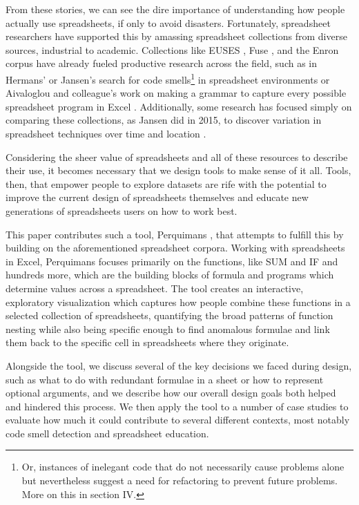 \documentclass[conference]{IEEEtran}
\newcommand{\toolname}{Perquimans }
\begin{document}
	From these stories, we can see the dire importance of understanding how people
	actually use spreadsheets, if only to avoid disasters. Fortunately, spreadsheet
	researchers have supported this by amassing spreadsheet collections from
	diverse sources, industrial to academic. Collections like EUSES
	\cite{fisher2005euses}, Fuse \cite{barik2015fuse}, and the Enron corpus
	\cite{hermans2015enron} have already fueled productive research across the
	field, such as in Hermans' \cite{hermans2012detecting} or Jansen's
	\cite{jansen2015code} search for code smells\footnote{Or, instances of
		inelegant code that do not necessarily cause problems alone but nevertheless
		suggest a need for refactoring to prevent future problems. More on this in
		section IV.} in spreadsheet environments or Aivaloglou and colleague's work on
	making a grammar to capture every possible spreadsheet program in Excel
	\cite{aivaloglou2015grammar}. Additionally, some research has focused simply on
	comparing these collections, as Jansen did in 2015, to discover variation in
	spreadsheet techniques over time and location \cite{jansen2015enron}.
	
	Considering the sheer value of spreadsheets and all of these resources to
	describe their use, it becomes necessary that we design tools to make sense of
	it all. Tools, then, that empower people to explore datasets are rife with the
	potential to improve the current design of spreadsheets themselves and educate
	new generations of spreadsheets users on how to work best.
	
	This paper contributes such a tool, \toolname, that attempts to fulfill this by
	building on the aforementioned spreadsheet corpora. Working with spreadsheets
	in Excel, \toolname focuses primarily on the functions, like SUM and IF and
	hundreds more, which are the building blocks of formula and programs which
	determine values across a spreadsheet. The tool creates an interactive,
	exploratory visualization which captures how people combine these functions in
	a selected collection of spreadsheets, quantifying the broad patterns of
	function nesting while also being specific enough to find anomalous formulae
	and link them back to the specific cell in spreadsheets where they originate.
	\par
	
	Alongside the tool, we discuss several of the key decisions we faced during
	design, such as what to do with redundant formulae in a sheet or how to
	represent optional arguments, and we describe how our overall design goals both
	helped and hindered this process. We then apply the tool to a number of case
	studies to evaluate how much it could contribute to several different contexts,
	most notably code smell detection and spreadsheet education.
	
\end{document}

